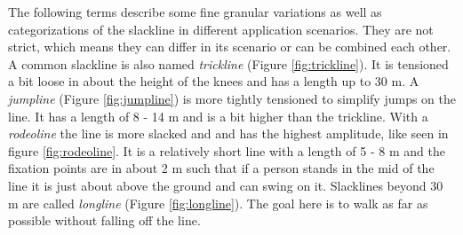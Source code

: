 The following terms describe some fine granular variations as well as categorizations of the slackline in different application scenarios. They are not strict, which means they can differ in its scenario or can be combined each other. A common slackline is also named \textit{trickline} (Figure \ref{fig:trickline}). It is tensioned a bit loose in about the height of the knees and has a length up to 30 m. A \textit{jumpline} (Figure \ref{fig:jumpline}) is more tightly tensioned to simplify jumps on the line. It has a length of 8 - 14 m and is a bit higher than the trickline. With a \textit{rodeoline} the line is more slacked and and has the highest amplitude, like seen in figure \ref{fig:rodeoline}. It is a relatively short line with a length of 5 - 8 m and the fixation points are in about 2 m such that if a person stands in the mid of the line it is just about above the ground and can swing on it. Slacklines beyond 30 m are called \textit{longline} (Figure \ref{fig:longline}). The goal here is to walk as far as possible without falling off the line.

